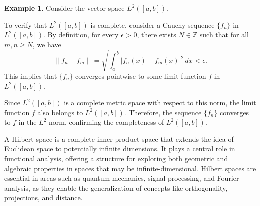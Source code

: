 \documentclass[12pt, reqno]{amsart}
\theoremstyle{definition}
\newtheorem{example}[theorem]{Example}
\numberwithin{equation}{section}
\begin{document}
\begin{example}
Consider the vector space \( L^2([a, b]) \).

To verify that \( L^2([a, b]) \) is complete, consider a Cauchy sequence \( \{ f_n \} \) in \( L^2([a, b]) \). By definition, for every \( \epsilon > 0 \), there exists \( N \in \mathbb{Z} \) such that for all \( m, n \geq N \), we have
\[
\|f_n - f_m\| = \sqrt{\int_a^b |f_n(x) - f_m(x)|^2 \, dx} < \epsilon.
\]
This implies that \( \{ f_n \} \) converges pointwise to some limit function \( f \) in \( L^2([a, b]) \).

Since \( L^2([a, b]) \) is a complete metric space with respect to this norm, the limit function \( f \) also belongs to \( L^2([a, b]) \). Therefore, the sequence \( \{ f_n \} \) converges to \( f \) in the \( L^2 \)-norm, confirming the completeness of \( L^2([a, b]) \).
\end{example}

A Hilbert space is a complete inner product space that extends the idea of Euclidean space to potentially infinite dimensions. It plays a central role in functional analysis, offering a structure for exploring both geometric and algebraic properties in spaces that may be infinite-dimensional. Hilbert spaces are essential in areas such as quantum mechanics, signal processing, and Fourier analysis, as they enable the generalization of concepts like orthogonality, projections, and distance.
    
\end{document}
